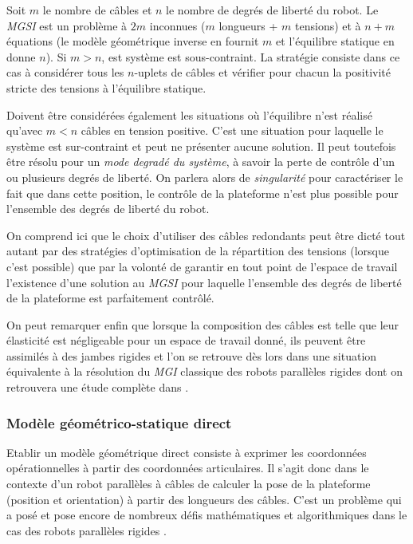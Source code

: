 Soit $m$ le nombre de câbles et $n$ le nombre de degrés de liberté du robot. Le {\it MGSI} est un problème à $2m$ inconnues ($m$ longueurs + $m$ tensions) et à $n+m$ équations (le modèle géométrique inverse en fournit $m$ et l'équilibre statique en donne $n$). Si $m > n$, est système est sous-contraint. La stratégie consiste dans ce cas à considérer tous les $n$-uplets de câbles et vérifier pour chacun la positivité stricte des tensions à l'équilibre statique.

Doivent être considérées également les situations où l'équilibre n'est réalisé qu'avec $m < n$ câbles en tension positive. C'est une situation pour laquelle le système est sur-contraint et peut ne présenter aucune solution. Il peut toutefois être résolu pour un {\it mode degradé du système}, à savoir la perte de contrôle d'un ou plusieurs degrés de liberté. On parlera alors de {\it singularité} pour caractériser le fait que dans cette position, le contrôle de la plateforme n'est plus possible pour l'ensemble des degrés de liberté du robot.

On comprend ici que le choix d'utiliser des câbles redondants peut être dicté tout autant par des stratégies d'optimisation de la répartition des tensions (lorsque c'est possible) que par la volonté de garantir en tout point de l'espace de travail l'existence d'une solution au {\it MGSI} pour laquelle l'ensemble des degrés de liberté de la plateforme est parfaitement contrôlé.

On peut remarquer enfin que lorsque la composition des câbles est telle que leur élasticité est négligeable pour un espace de travail donné, ils peuvent être assimilés à des jambes rigides et l'on se retrouve dès lors dans une situation équivalente à la résolution du {\it MGI} classique des robots parallèles rigides dont on retrouvera une étude complète dans \cite{merlet1997robots}.

\subsubsection{Modèle géométrico-statique direct}

Etablir un modèle géométrique direct consiste à exprimer les coordonnées opérationnelles à partir des coordonnées articulaires. Il s'agit donc dans le contexte d'un robot parallèles à câbles de calculer la pose de la plateforme (position et orientation) à partir des longueurs des câbles. C'est un problème qui a posé et pose encore de nombreux défis mathématiques et algorithmiques dans le cas des robots parallèles rigides \cite{merlet1997robots}.

